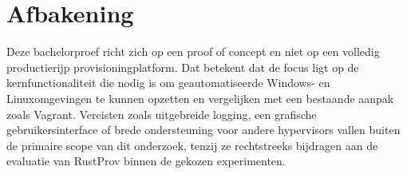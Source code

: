 \section{Afbakening}
Deze bachelorproef richt zich op een proof of concept en niet op een volledig productierijp provisioningplatform. Dat betekent dat de focus ligt op de kernfunctionaliteit die nodig is om geautomatiseerde Windows- en Linuxomgevingen te kunnen opzetten en vergelijken met een bestaande aanpak zoals Vagrant. Vereisten zoals uitgebreide logging, een grafische gebruikersinterface of brede ondersteuning voor andere hypervisors vallen buiten de primaire scope van dit onderzoek, tenzij ze rechtstreeks bijdragen aan de evaluatie van RustProv binnen de gekozen experimenten.

